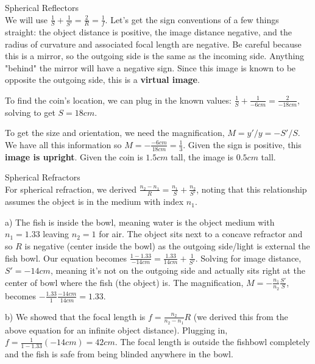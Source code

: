 \documentclass[10pt]{article}
\newenvironment{problem}[2][Problem]{\begin{trivlist}
\item[\hskip \labelsep {\bfseries #1}\hskip \labelsep {\bfseries #2.}]}{\end{trivlist}}
\begin{document}
\begin{problem}{4} Spherical Reflectors\\
We will use $\frac{1}{S} + \frac{1}{S'} = \frac{2}{R}=\frac{1}{f}$. Let's get the sign conventions of a few things straight: the object distance is positive, the image distance negative, and the radius of curvature and associated focal length are negative. Be careful because this is a mirror, so the outgoing side is the same as the incoming side. Anything "behind" the mirror will have a negative sign. Since this image is known to be opposite the outgoing side, this is a \textbf{virtual image}.
\item To find the coin's location, we can plug in the known values: $\frac{1}{S} + \frac{1}{-6cm} = \frac{2}{-18cm}$, solving to get $S=18cm$.
\item To get the size and orientation, we need the magnification, $M=y'/y= -S'/S$. We have all this information so $M=-\frac{-6cm}{18cm}=\frac{1}{3}$. Given the sign is positive, this \textbf{image is upright}. Given the coin is $1.5cm$ tall, the image is $0.5cm$ tall.
\end{problem}

\begin{problem}{5} Spherical Refractors\\
For spherical refraction, we derived $\frac{n_2-n_1}{R} = \frac{n_1}{S} + \frac{n_2}{S'}$, noting that this relationship assumes the object is in the medium with index $n_1$.
\item a) The fish is inside the bowl, meaning water is the object medium with $n_1=1.33$ leaving $n_2=1$ for air. The object sits next to a concave refractor and so $R$ is negative (center inside the bowl) as the outgoing side/light is external the fish bowl. Our equation becomes $\frac{1-1.33}{-14cm} = \frac{1.33}{14cm} + \frac{1}{S'}$. Solving for image distance, $S'=-14cm$, meaning it's not on the outgoing side and actually sits right at the center of bowl where the fish (the object) is. The magnification, $M = -\frac{n_1}{n_2}\frac{S'}{S}$, becomes $-\frac{1.33}{1}\frac{-14cm}{14cm}=1.33$.
\item b) We showed that the focal length is $f=\frac{n_2}{n_2-n_1}R$ (we derived this from the above equation for an infinite object distance). Plugging in, $f=\frac{1}{1-1.33}(-14cm)=42cm$. The focal length is outside the fishbowl completely and the fish is safe from being blinded anywhere in the bowl.
\end{problem}
\end{document}
